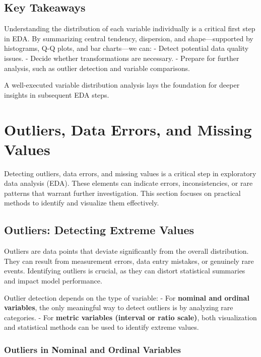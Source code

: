 \documentclass[12pt,openany]{book}
\begin{document}
\subsection{Key Takeaways}

Understanding the distribution of each variable individually is a critical first step in EDA. By summarizing central tendency, dispersion, and shape—supported by histograms, Q-Q plots, and bar charts—we can:
- Detect potential data quality issues.
- Decide whether transformations are necessary.
- Prepare for further analysis, such as outlier detection and variable comparisons.

A well-executed variable distribution analysis lays the foundation for deeper insights in subsequent EDA steps.



\section{Outliers, Data Errors, and Missing Values}

Detecting outliers, data errors, and missing values is a critical step in 
exploratory data analysis (EDA). These elements can indicate errors, 
inconsistencies, or rare patterns that warrant further investigation. 
This section focuses on practical methods to identify and visualize them 
effectively.

\subsection{Outliers: Detecting Extreme Values}

Outliers are data points that deviate significantly from the overall 
distribution. They can result from measurement errors, data entry 
mistakes, or genuinely rare events. Identifying outliers is crucial, 
as they can distort statistical summaries and impact model performance.
\newline

Outlier detection depends on the type of variable:  
\newline
- For \textbf{nominal and ordinal variables}, the only meaningful way to detect 
  outliers is by analyzing rare categories.  
\newline
- For \textbf{metric variables (interval or ratio scale)}, both visualization and 
  statistical methods can be used to identify extreme values.
\newline

\subsubsection{Outliers in Nominal and Ordinal Variables}
\end{document}
